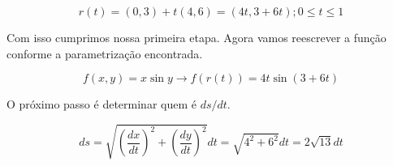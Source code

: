 $$r(t)=(0,3)+t(4,6)=(4t,3+6t); 0\leq t\leq 1$$

Com isso cumprimos nossa primeira etapa. Agora vamos reescrever a função conforme a parametrização encontrada.

$$f(x,y)=x\sin y \rightarrow f(r(t))=4t \sin (3+6t) $$

O próximo passo é determinar quem é $ds/dt$.

$$ds=\sqrt{\left( \dfrac{dx}{dt} \right)^2+\left( \dfrac{dy}{dt} \right)^2}dt=\sqrt{4^2+6^2}dt=2\sqrt{13}dt$$

